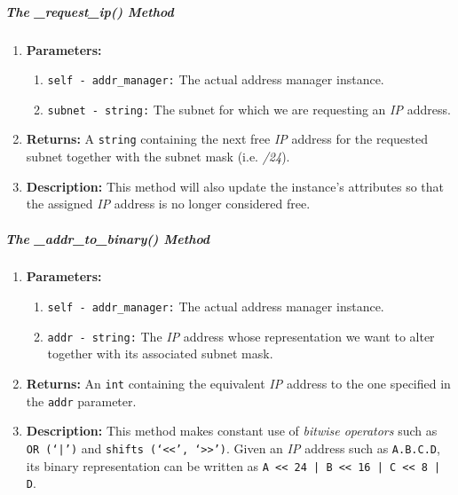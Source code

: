         \subparagraph{The \_request\_ip() Method}
            \begin{enumerate}
                \item \textbf{Parameters:}
                \begin{enumerate}
                    \item \texttt{self - addr\_manager:} The actual address manager instance.
                    \item \texttt{subnet - string:} The subnet for which we are  requesting an \textit{IP} address.
                \end{enumerate}
                \item \textbf{Returns:} A \texttt{string} containing the next free \textit{IP} address for the requested subnet together with the subnet mask (i.e. \textit{/24}).
                \item \textbf{Description:} This method will also update the instance's attributes so that the assigned \textit{IP} address is no longer considered free.
            \end{enumerate}

        \subparagraph{The \_addr\_to\_binary() Method}
            \begin{enumerate}
                \item \textbf{Parameters:}
                \begin{enumerate}
                    \item \texttt{self - addr\_manager:} The actual address manager instance.
                    \item \texttt{addr - string:} The \textit{IP} address whose representation we want to alter together with its associated subnet mask.
                \end{enumerate}
                \item \textbf{Returns:} An \texttt{int} containing the equivalent \textit{IP} address to the one specified in the \texttt{addr} parameter.
                \item \textbf{Description:} This method makes constant use of \textit{bitwise operators} such as \texttt{OR (`|')} and \texttt{shifts (`<<', `>>')}. Given an \textit{IP} address such as \texttt{A.B.C.D}, its binary representation can be written as \texttt{A << 24 | B << 16 | C << 8 | D}.
            \end{enumerate}

